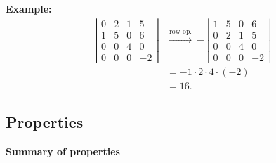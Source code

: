 \documentclass[12pt]{article}
\begin{document}
\vspace{1em}

\noindent\textbf{Example:} \begin{align*}
    \left| \begin{array}{cccc}
         0 & 2 & 1 & 5 \\ 1 & 5 & 0 & 6 \\ 0 & 0 & 4 & 0 \\ 0 & 0 & 0 & -2
    \end{array} \right| &\xrightarrow{\text{row op.}} - \left| \begin{array}{cccc}
         1 & 5 & 0 & 6 \\ 0 & 2 & 1 & 5 \\ 0 & 0 & 4 & 0 \\ 0 & 0 & 0 & -2
    \end{array} \right| \\ 
    &= -1 \cdot 2 \cdot 4 \cdot (-2) \\ 
    &= 16.
\end{align*}

\subsection{Properties}

\textbf{Summary of properties}
\end{document}
